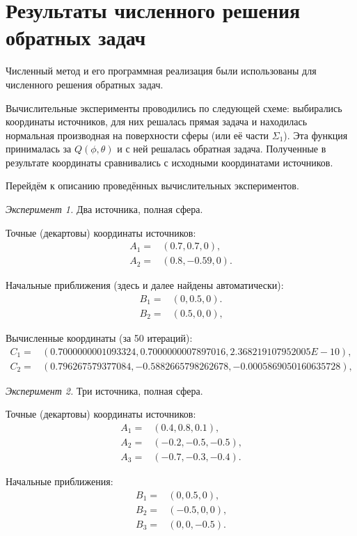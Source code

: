 \section{Результаты численного решения обратных задач}

Численный метод и его программная реализация были использованы для численного решения обратных задач.

Вычислительные эксперименты проводились по следующей схеме: выбирались координаты источников, для них решалась прямая задача и находилась нормальная производная на поверхности сферы (или её части $\Sigma_1$). Эта функция принималась за $Q(\phi, \theta)$ и с ней решалась обратная задача. Полученные в результате координаты сравнивались с исходными координатами источников.

Перейдём к описанию проведённых вычислительных экспериментов.

\emph{Эксперимент 1.} Два источника, полная сфера.

Точные (декартовы) координаты источников:
\begin{align}
    A_1 =& (0.7, 0.7, 0) \text{,}\nonumber\\
    A_2 =& (0.8, -0.59, 0) \text{.}\nonumber
\end{align}

Начальные приближения (здесь и далее найдены автоматически):
\begin{align}
    B_1 =& (0, 0.5, 0) \text{.}\nonumber\\
    B_2 =& (0.5, 0, 0) \text{,}\nonumber
\end{align}

Вычисленные координаты (за 50 итераций):
\begin{align}
    C_1 =& (0.7000000001093324, 0.7000000007897016, 2.368219107952005E-10) \text{,}\nonumber\\
    C_2 =& (0.796267579377084, -0.5882665798262678, -0.0005869050160635728) \text{,}\nonumber
\end{align}

\newpage
\emph{Эксперимент 2.} Три источника, полная сфера.

Точные (декартовы) координаты источников:
\begin{align}
    A_1 =& (0.4, 0.8, 0.1) \text{,}\nonumber\\
    A_2 =& (-0.2, -0.5, -0.5) \text{,}\nonumber\\
    A_3 =& (-0.7, -0.3, -0.4) \text{.}\nonumber
\end{align}

Начальные приближения:
\begin{align}
    B_1 =& (0, 0.5, 0) \text{,}\nonumber\\
    B_2 =& (-0.5, 0, 0) \text{,}\nonumber\\
    B_3 =& (0, 0, -0.5) \text{.}\nonumber
\end{align}

